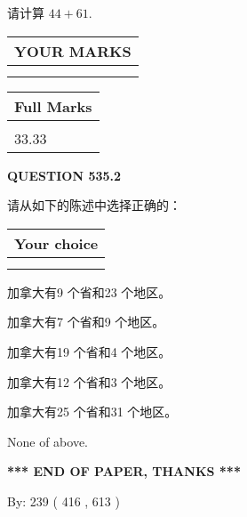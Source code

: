 \documentclass{ctexart}
\begin{document}
  
 
请计算 $ %
44 +  %
61 $.
 

 

 
  
\vspace{0.2in}
  
\noindent\begin{tabular}{|l|}
\hline
 YOUR MARKS  \\
\hline
 \\ 
 \\ 
\hline
\end{tabular}
\hspace{0.05in} \begin{tabular}{|l|}
\hline
 Full Marks  \\
\hline
 \\ 
33.33 \\
\hline
\end{tabular}
{\textbf{\Large{QUESTION
535.2 
}}}
  
  
请从如下的陈述中选择正确的：
  
  
\noindent\hspace{3.0in} \begin{tabular}{|l|}
\hline
Your choice \\
\hline
 \\ 
 \\ 
\hline
\end{tabular}
  
  
 
 
加拿大有9 个省和23 个地区。
 
 
加拿大有7 个省和9 个地区。
 
 
加拿大有19 个省和4 个地区。
 
 
加拿大有12 个省和3 个地区。
 
 
加拿大有25 个省和31 个地区。
 
 
 None of above.
 
 
   
   
 \vspace{0.2in}
 
   
   
   
   
\vspace{1.0in} 
{\textbf{\large{ *** END OF PAPER, THANKS *** }}} 
   
   
\hspace{1.0in} By: 
 239 ( 416 ,  613 )
   
\end{document}

